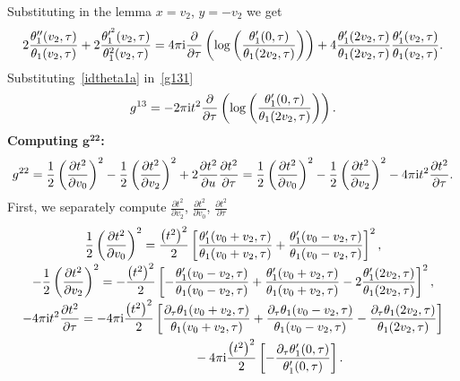 \documentclass[pdftex]{sigma}%
\numberwithin{equation}{section}
\begin{document}
Substituting in the lemma $x=v_2$, $y=-v_2$ we get
\begin{gather}
\label{idtheta1a}
2\frac{\theta_1^{\prime\prime}(v_2,\tau)}{\theta_1(v_2,\tau)} +2\frac{\theta_1^{\prime^2}(v_2,\tau)}{\theta_1^2(v_2,\tau)}
=4\pi {\rm i} \frac{\partial}{\partial \tau}\left(\log\left(\frac{\theta_1^{\prime}(0,\tau)}{\theta_1(2v_2,\tau)}\right)\right) +4\frac{\theta_1^{\prime}(2v_2,\tau)}{\theta_1(2v_2,\tau)} \frac{\theta_1^{\prime}(v_2,\tau)}{\theta_1(v_2,\tau)}.
\end{gather}
Substituting~\eqref{idtheta1a} in~\eqref{g131}
\begin{gather*}
g^{13}=-2\pi {\rm i} t^2 \frac{\partial}{\partial \tau}\left(\log\left(\frac{\theta_1^{\prime}(0,\tau)}{\theta_1(2v_2,\tau)}\right)\right).
\end{gather*}
\textbf{Computing $\boldsymbol {g^{22}}$:}
\begin{gather*}
g^{22}=\frac{1}{2}\left(\frac{\partial t^2}{\partial v_0}\right)^2-\frac{1}{2}\left(\frac{\partial t^2}{\partial v_2}\right)^2+2\frac{\partial t^2}{\partial u}\frac{\partial t^2}{\partial \tau}=\frac{1}{2}\left(\frac{\partial t^2}{\partial v_0}\right)^2-\frac{1}{2}\left(\frac{\partial t^2}{\partial v_2}\right)^2-4\pi {\rm i}t^2\frac{\partial t^2}{\partial \tau}.
\end{gather*}
First, we separately compute $\frac{\partial t^2}{\partial v_2}$, $\frac{\partial t^2}{\partial v_0}$, $\frac{\partial t^2}{\partial \tau}$
\begin{gather*}
\frac{1}{2}\left(\frac{\partial t^2}{\partial v_0}\right)^2=\frac{\big(t^2\big)^2}{2}\left[\frac{\theta_1^{\prime}(v_0+v_2,\tau)}{\theta_1(v_0+v_2,\tau)} +\frac{\theta_1^{\prime}(v_0-v_2,\tau)}{\theta_1(v_0-v_2,\tau)}\right]^2,
\\[-.5ex]
-\frac{1}{2}\left(\frac{\partial t^2}{\partial v_2}\right)^2 =-\frac{\big(t^2\big)^2}{2}\left[-\frac{\theta_1^{\prime}(v_0-v_2,\tau)}{\theta_1(v_0-v_2,\tau)} +\frac{\theta_1^{\prime}(v_0+v_2,\tau)}{\theta_1(v_0+v_2,\tau)} -2\frac{\theta_1^{\prime}(2v_2,\tau)}{\theta_1(2v_2,\tau)}\right]^2,
\\[-.5ex]
-4\pi {\rm i} t^2\frac{\partial t^2}{\partial \tau}=-4\pi {\rm i} \frac{\big(t^2\big)^2}{2}\left[\frac{\partial_{\tau}\theta_1(v_0+v_2,\tau)}{\theta_1(v_0+v_2,\tau)} +\frac{\partial_{\tau}\theta_1(v_0-v_2,\tau)}{\theta_1(v_0-v_2,\tau)} -\frac{\partial_{\tau}\theta_1(2v_2,\tau)}{\theta_1(2v_2,\tau)}\right]
\\ \hphantom{-4\pi {\rm i} t^2\frac{\partial t^2}{\partial \tau}=}
{}-4\pi {\rm i} \frac{\big(t^2\big)^2}{2}\left[-\frac{\partial_{\tau}\theta_1^{\prime}(0,\tau)}{\theta_1^{\prime}(0,\tau)}\right].
\end{gather*}
\end{document}
